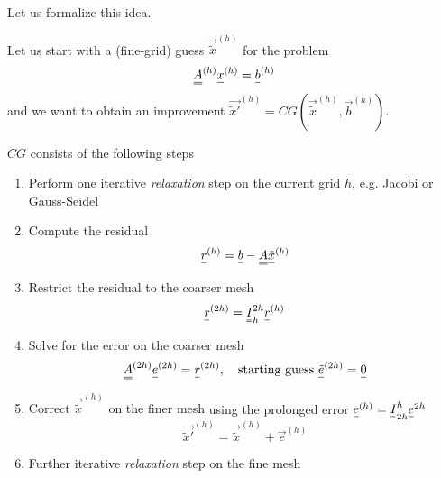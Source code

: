 

Let us formalize this idea.

Let us start with a (fine-grid) guess $\vec{\tilde{x}}^{(h)}$ for the problem
\begin{equation}
    \mat{A}^{(h)} \vec{x}^{(h)} = \vec{b}^{(h)}
\end{equation}
and we want to obtain an improvement $\vec{\tilde{x}'}^{(h)} = CG(\vec{\tilde{x}}^{(h)}, \vec{b}^{(h)})$.

$CG$ consists of the following steps
\begin{enumerate}
    \item Perform \textcolor{blue1}{one iterative \textit{relaxation}} step on the current grid $h$, e.g. Jacobi or Gauss-Seidel
    \item \textcolor{blue1}{Compute the residual}
    \begin{equation}
        \vec{r}^{(h)} = \vec{b} - \mat{A}\vec{\tilde{x}}^{(h)}
    \end{equation}
    \item \textcolor{blue1}{Restrict the residual} to the coarser mesh
    \begin{equation}
        \vec{r}^{(2h)} = \mat{I}_{h}^{2h}\vec{r}^{(h)}
    \end{equation}
    \item \textcolor{blue1}{Solve for the error on the coarser mesh}
    \begin{equation}
        \mat{A}^{(2h)}\vec{e}^{(2h)} = \vec{r}^{(2h)}, \quad \text{starting guess } \vec{\tilde{e}}^{(2h)} = \vec{0}
    \end{equation}
    \item \textcolor{blue1}{Correct $\vec{\tilde{x}}^{(h)}$ on the finer mesh} using the prolonged error
    $\vec{e}^{(h)} = \mat{I}_{2h}^{h} \vec{e}^{2h}$
    \begin{equation}
        \vec{\tilde{x}'}^{(h)} = \vec{\tilde{x}}^{(h)} + \vec{e}^{(h)}
    \end{equation}
    \item \textcolor{blue1}{Further iterative \textit{relaxation}} step on the fine mesh
\end{enumerate}

